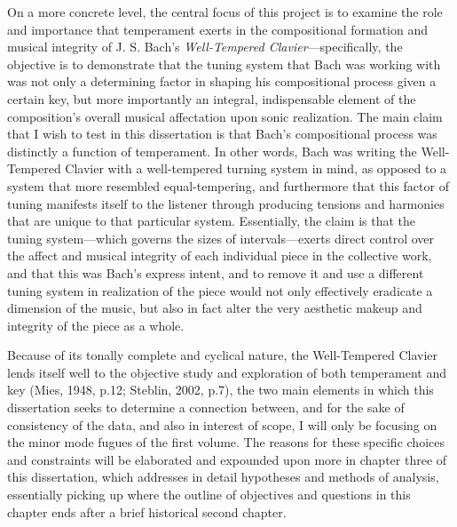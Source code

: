 On a more concrete level, the central focus of this project is to
examine the role and importance that temperament exerts in the
compositional formation and musical integrity of J. S. Bach's
\emph{Well-Tempered Clavier}---specifically, the objective is to
demonstrate that the tuning system that Bach was working with was not
only a determining factor in shaping his compositional process given a
certain key, but more importantly an integral, indispensable element of
the composition's overall musical affectation upon sonic realization.
The main claim that I wish to test in this dissertation is that Bach's
compositional process was distinctly a function of temperament. In other
words, Bach was writing the Well-Tempered Clavier with a well-tempered
turning system in mind, as opposed to a system that more resembled
equal-tempering, and furthermore that this factor of tuning manifests
itself to the listener through producing tensions and harmonies that are
unique to that particular system. Essentially, the claim is that the
tuning system---which governs the sizes of intervals---exerts direct
control over the affect and musical integrity of each individual piece
in the collective work, and that this was Bach's express intent, and to
remove it and use a different tuning system in realization of the piece
would not only effectively eradicate a dimension of the music, but also
in fact alter the very aesthetic makeup and integrity of the piece as a
whole.

Because of its tonally complete and cyclical nature, the Well-Tempered
Clavier lends itself well to the objective study and exploration of both
temperament and key (Mies, 1948, p.12; Steblin, 2002, p.7), the two main
elements in which this dissertation seeks to determine a connection
between, and for the sake of consistency of the data, and also in
interest of scope, I will only be focusing on the minor mode fugues of
the first volume. The reasons for these specific choices and constraints
will be elaborated and expounded upon more in chapter three of this
dissertation, which addresses in detail hypotheses and methods of
analysis, essentially picking up where the outline of objectives and
questions in this chapter ends after a brief historical second chapter.

